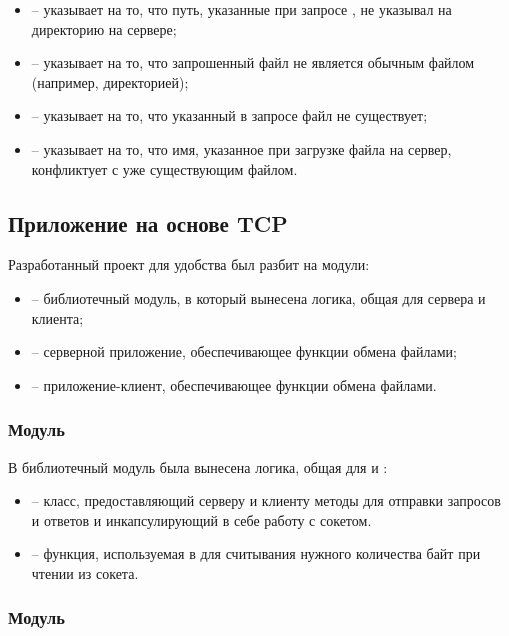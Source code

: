 \begin{itemize}
\begin{itemize}
		\item {} -- указывает на то, что путь, указанные при запросе , не указывал на директорию на сервере;
		\item {} -- указывает на то, что запрошенный файл не является обычным файлом (например, директорией);
		\item {} -- указывает на то, что указанный в запросе файл не существует;
		\item {} -- указывает на то, что имя, указанное при загрузке файла на сервер, конфликтует с уже существующим файлом.
	\end{itemize}
\end{itemize}

\subsection{Приложение на основе TCP}

Разработанный проект  для удобства был разбит на модули:
\begin{itemize}
	\item {} -- библиотечный модуль, в который вынесена логика, общая для сервера и клиента;
	\item {} -- серверной приложение, обеспечивающее функции обмена файлами;
	\item {} -- приложение-клиент, обеспечивающее функции обмена файлами.
\end{itemize}

\subsubsection{Модуль }

В библиотечный модуль  была вынесена логика, общая для  и :
\begin{itemize}
	\item {} -- класс, предоставляющий серверу и клиенту методы для отправки запросов и ответов и инкапсулирующий в себе работу с сокетом.
	\item {} -- функция, используемая в  для считывания нужного количества байт при чтении из сокета.

\end{itemize}

\subsubsection{Модуль }

